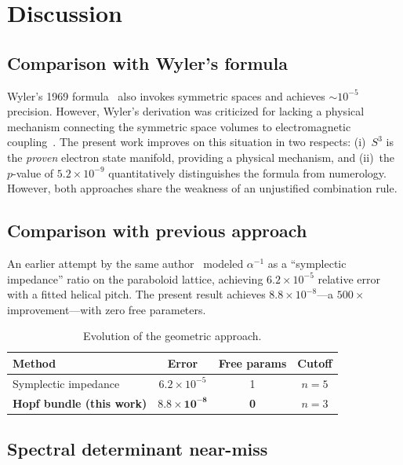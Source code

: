 \documentclass[aps,prl,twocolumn,superscriptaddress]{revtex4-2}
\begin{document}
\section{Discussion}

\subsection{Comparison with Wyler's formula}

Wyler's 1969 formula~\cite{wyler1969} also invokes symmetric spaces
and achieves $\sim 10^{-5}$ precision. However, Wyler's derivation
was criticized for lacking a physical mechanism connecting the
symmetric space volumes to electromagnetic
coupling~\cite{robertson1971}. The present work improves on this
situation in two respects: (i)~$S^3$ is the \textit{proven} electron
state manifold, providing a physical mechanism, and (ii)~the
$p$-value of $5.2 \times 10^{-9}$ quantitatively distinguishes the
formula from numerology. However, both approaches share the weakness
of an unjustified combination rule.

\subsection{Comparison with previous approach}

An earlier attempt by the same author~\cite{paper2_old} modeled
$\alpha^{-1}$ as a ``symplectic impedance'' ratio on the
paraboloid lattice, achieving $6.2 \times 10^{-5}$ relative error
with a fitted helical pitch. The present result achieves
$8.8 \times 10^{-8}$---a $500\times$ improvement---with zero free
parameters.

\begin{table}[h]
\centering
\begin{tabular}{lccc}
\hline\hline
Method & Error & Free params & Cutoff \\
\hline
Symplectic impedance~\cite{paper2_old} & $6.2\times 10^{-5}$ & 1 & $n=5$ \\
\textbf{Hopf bundle (this work)} & $\mathbf{8.8\times 10^{-8}}$ & \textbf{0} & $n=3$ \\
\hline\hline
\end{tabular}
\caption{Evolution of the geometric approach.}
\label{tab:evolution}
\end{table}


\subsection{Spectral determinant near-miss}
\end{document}
